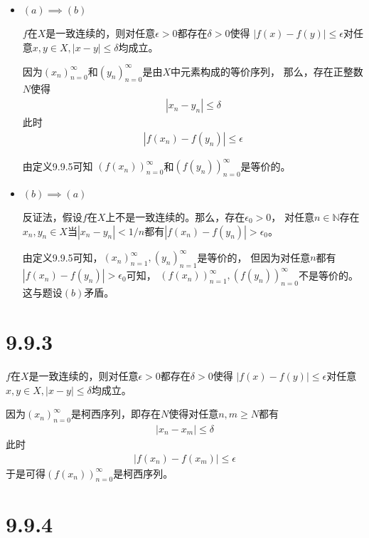 \documentclass{article}
\begin{document}
\begin{itemize}
  \item $(a) \implies (b)$

        $f$在$X$是一致连续的，则对任意$\epsilon > 0$都存在$\delta > 0$使得
        $|f(x) - f(y)| \leq \epsilon$对任意$x, y \in X, |x - y| \leq \delta$均成立。

        因为$(x_n)_{n=0}^\infty$和$(y_n)_{n=0}^\infty$是由$X$中元素构成的等价序列，
        那么，存在正整数$N$使得
        \begin{align*}
          |x_n - y_n| \leq \delta
        \end{align*}
        此时
        \begin{align*}
          | f(x_n) - f(y_n) | \leq \epsilon
        \end{align*}

        由定义9.9.5可知
        $(f(x_n))_{n=0}^\infty$和$(f(y_n))_{n=0}^\infty$是等价的。


  \item $(b) \implies (a)$

        反证法，假设$f$在$X$上不是一致连续的。那么，存在$\epsilon_0 > 0$，
        对任意$n \in \mathbb{N}$存在$x_n, y_n \in X$当$|x_n - y_n| < 1/n$都有$|f(x_n) - f(y_n)| > \epsilon_0$。

        由定义9.9.5可知，$(x_n)_{n=1}^\infty, (y_n)_{n=1}^\infty$是等价的，
        但因为对任意$n$都有$|f(x_n) - f(y_n)| > \epsilon_0$可知，
        $(f(x_n))_{n=1}^\infty,(f(y_n))_{n=0}^\infty$不是等价的。
        这与题设$(b)$矛盾。
\end{itemize}

\section*{9.9.3}

$f$在$X$是一致连续的，则对任意$\epsilon > 0$都存在$\delta > 0$使得
$|f(x) - f(y)| \leq \epsilon$对任意$x, y \in X, |x - y| \leq \delta$均成立。

因为$(x_n)_{n=0}^\infty$是柯西序列，即存在$N$使得对任意$n,m \geq N$都有
\begin{align*}
  |x_n - x_m| \leq \delta
\end{align*}
此时
\begin{align*}
  |f(x_n) - f(x_m)| \leq \epsilon
\end{align*}
于是可得$(f(x_n))_{n=0}^\infty$是柯西序列。

\section*{9.9.4}
\end{document}
